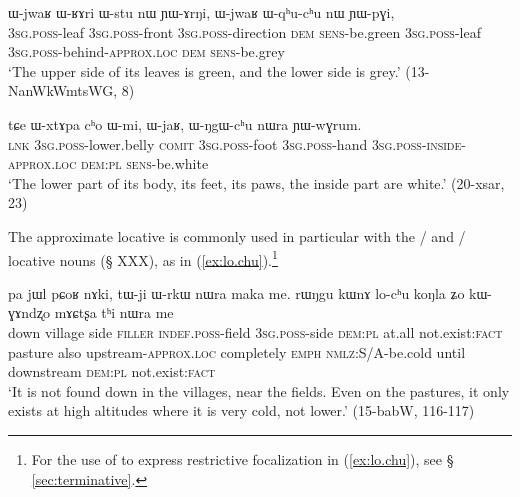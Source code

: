  
  \begin{exe}
\ex \label{ex:Wqhu.chu}
 \gll  ɯ-jwaʁ ɯ-ʁɤri ɯ-stu nɯ ɲɯ-ɤrŋi, ɯ-jwaʁ ɯ-qʰu-cʰu nɯ ɲɯ-pɣi, \\
 \textsc{3sg}.\textsc{poss}-leaf  \textsc{3sg}.\textsc{poss}-front \textsc{3sg}.\textsc{poss}-direction \textsc{dem} \textsc{sens}-be.green   \textsc{3sg}.\textsc{poss}-leaf  \textsc{3sg}.\textsc{poss}-behind-\textsc{approx}.\textsc{loc} \textsc{dem} \textsc{sens}-be.grey \\
 \glt  `The upper side of its leaves is green, and the lower side is grey.' (13-NanWkWmtsWG, 8)
  \end{exe}
  
   \begin{exe}
\ex \label{ex:WNgW.chu}
 \gll tɕe ɯ-xtɤpa cʰo ɯ-mi, ɯ-jaʁ, ɯ-ŋgɯ-cʰu nɯra ɲɯ-wɣrum. \\
\textsc{lnk} \textsc{3sg}.\textsc{poss}-lower.belly \textsc{comit}  \textsc{3sg}.\textsc{poss}-foot  \textsc{3sg}.\textsc{poss}-hand  \textsc{3sg}.\textsc{poss}-\textsc{inside}-\textsc{approx}.\textsc{loc} \textsc{dem}:\textsc{pl}  \textsc{sens}-be.white \\
\glt `The lower part of its body, its feet, its paws, the inside part are white.' (20-xsar, 23)
    \end{exe}

The approximate locative  is commonly used in particular with the  /  and  /  locative nouns (§ XXX), as in (\ref{ex:lo.chu}).\footnote{For the use of  to express restrictive focalization in (\ref{ex:lo.chu}), see § \ref{sec:terminative}. }

\begin{exe}
\ex \label{ex:lo.chu}
 \gll  pa jɯl pɕoʁ nɤki, tɯ-ji ɯ-rkɯ nɯra maka me. rɯŋgu kɯnɤ lo-cʰu koŋla ʑo kɯ-ɣɤndʐo mɤɕtʂa tʰi nɯra me \\
 down village side \textsc{filler} \textsc{indef}.\textsc{poss}-field \textsc{3sg}.\textsc{poss}-side \textsc{dem}:\textsc{pl} at.all not.exist:\textsc{fact} pasture also upstream-\textsc{approx}.\textsc{loc} completely \textsc{emph} \textsc{nmlz}:S/A-be.cold until downstream \textsc{dem}:\textsc{pl} not.exist:\textsc{fact} \\
\glt  `It is not found down in the villages, near the fields. Even on the pastures, it only exists at high altitudes where it is very cold, not lower.' (15-babW, 116-117)
\end{exe}
 
